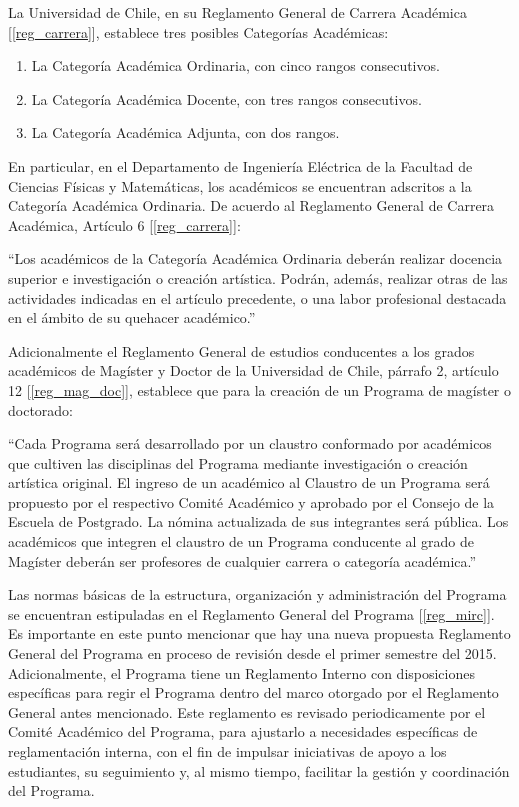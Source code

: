La Universidad de Chile, en su Reglamento General de Carrera Académica [\ref{reg_carrera}], establece tres
posibles Categorías Académicas:

\begin{enumerate}
\item La Categoría Académica Ordinaria, con cinco rangos consecutivos.
\item La Categoría Académica Docente, con tres rangos consecutivos.
\item La Categoría Académica Adjunta, con dos rangos.
\end{enumerate}

En particular, en el Departamento de Ingeniería Eléctrica de la Facultad de Ciencias Físicas
y Matemáticas, los académicos se encuentran adscritos a la Categoría Académica Ordinaria. De
acuerdo al Reglamento General de Carrera Académica, Artículo 6 [\ref{reg_carrera}]:

``Los académicos de la Categoría Académica Ordinaria deberán realizar docencia superior e
investigación o creación artística. Podrán, además, realizar otras de las actividades indicadas en
el artículo precedente, o una labor profesional destacada en el ámbito de su quehacer
académico.''

Adicionalmente el Reglamento General de estudios conducentes a los grados académicos de
Magíster y Doctor de la Universidad de Chile, párrafo 2, artículo 12 [\ref{reg_mag_doc}], establece que para la
creación de un Programa de magíster o doctorado:

``Cada Programa será desarrollado por un claustro conformado por académicos que cultiven las
disciplinas del Programa mediante investigación o creación artística original. El ingreso de un
académico al Claustro de un Programa será propuesto por el respectivo Comité Académico y
aprobado por el Consejo de la Escuela de Postgrado. La nómina actualizada de sus integrantes
será pública. Los académicos que integren el claustro de un Programa conducente al grado de
Magíster deberán ser profesores de cualquier carrera o categoría académica.''

Las normas básicas de la estructura, organización y administración del Programa se encuentran
estipuladas en el Reglamento General del Programa [\ref{reg_mirc}]. Es importante en este punto mencionar
que hay una nueva propuesta Reglamento General del Programa en proceso de revisión desde
el primer semestre del 2015. Adicionalmente, el Programa tiene un Reglamento Interno con
disposiciones específicas para regir el Programa dentro del marco otorgado por el Reglamento
General antes mencionado. Este reglamento es revisado periodicamente por el Comité Académico
del Programa, para ajustarlo a necesidades específicas de reglamentación interna, con el fin de
impulsar iniciativas de apoyo a los estudiantes, su seguimiento y, al mismo tiempo, facilitar la
gestión y coordinación del Programa.

